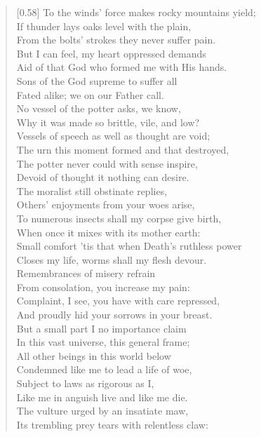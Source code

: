\begin{verse}[0.58\textwidth]
To the winds' force makes rocky mountains yield;\\
If thunder lays oaks level with the plain,\\
From the bolts' strokes they never suffer pain.\\
But I can feel, my heart oppressed demands\\
Aid of that God who formed me with His hands.\\
Sons of the God supreme to suffer all\\
Fated alike; we on our Father call.\\
No vessel of the potter asks, we know,\\
Why it was made so brittle, vile, and low?\\
Vessels of speech as well as thought are void;\\
The urn this moment formed and that destroyed,\\
The potter never could with sense inspire,\\
Devoid of thought it nothing can desire.\\
The moralist still obstinate replies,\\
Others' enjoyments from your woes arise,\\
To numerous insects shall my corpse give birth,\\
When once it mixes with its mother earth:\\
Small comfort 'tis that when Death's ruthless power\\
Closes my life, worms shall my flesh devour.\\
Remembrances of misery refrain\\
From consolation, you increase my pain:\\
Complaint, I see, you have with care repressed,\\
And proudly hid your sorrows in your breast.\\
But a small part I no importance claim\\
In this vast universe, this general frame;\\
All other beings in this world below\\
Condemned like me to lead a life of woe,\\
Subject to laws as rigorous as I,\\
Like me in anguish live and like me die.\\
The vulture urged by an insatiate maw,\\
Its trembling prey tears with relentless claw:\\

\end{verse}
